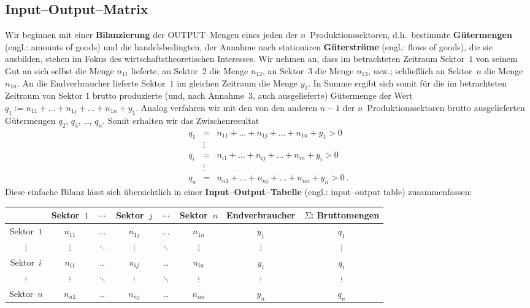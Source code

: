 \subsection{Input--Output--Matrix}
Wir beginnen mit einer {\bf Bilanzierung} der OUTPUT--Mengen eines
jeden der $n$~Produktionssektoren, d.h.\ bestimmte
{\bf G\"utermengen} (engl.: amounts of goods) und die 
handelsbedingten, der Annahme nach station\"{a}ren {\bf 
G\"uterstr\"ome} (engl.: flows of goods), die sie ausbilden,
stehen im Fokus des wirtschaftstheoretischen Interesses. Wir nehmen
an, dass im betrachteten Zeitraum Sektor~$1$ von seinem Gut an sich
selbst die Menge $n_{11}$ lieferte, an Sektor~$2$ die Menge
$n_{12}$, an Sektor~$3$ die Menge $n_{13}$, usw.; schlie\ss lich
an Sektor~$n$ die Menge $n_{1n}$. An die Endverbraucher lieferte
Sektor~$1$ im gleichen Zeitraum die Menge $y_{1}$. In Summe ergibt
sich somit f\"ur die im betrachteten Zeitraum von Sektor $1$ brutto
produzierte (und, nach Annahme~3, auch ausgelieferte) G\"utermenge
der Wert
$q_{1}:=n_{11} + \ldots + n_{1j} + \ldots + n_{1n} + y_{1}$.
Analog verfahren wir mit den von den anderen $n-1$ der
$n$~Produktionssektoren brutto ausgelieferten G\"utermengen
$q_{2}$, $q_{3}$, \ldots, $q_{n}$. Somit erhalten wir das
Zwischenresultat
%
\begin{eqnarray}
q_{1} & = & n_{11} + \ldots + n_{1j} + \ldots + n_{1n} + y_{1} > 0
\\
 & \vdots & \nonumber \\
q_{i} & = & n_{i1} + \ldots + n_{ij} + \ldots + n_{in} + y_{i} > 0
\\
 & \vdots & \nonumber \\
q_{n} & = & n_{n1} + \ldots + n_{nj} + \ldots + n_{nn} + y_{n} > 0
\ .
\end{eqnarray}
%
Diese einfache Bilanz l\"asst sich \"ubersichtlich
in einer {\bf Input--Output--Tabelle} (engl.: input--output table) 
zusammenfassen:
%
\begin{center}
    \begin{tabular}[h]{c|ccccc|c|c}
    \hline\hline
    [Werte in ME] & Sektor~$1$ & $\cdots$ & Sektor~$j$ & $\cdots$ & Sektor~$n$ & Endverbraucher & $\Sigma$: Bruttomengen  \\
    \hline
    Sektor~$1$ & $n_{11}$ & $\ldots$ & $n_{1j}$ & $\ldots$ & $n_{1n}$ & $y_{1}$ & $q_{1}$ \\
    $\vdots$ & $\vdots$ & $\ddots$ & $\vdots$ & $\ddots$ & $\vdots$ & $\vdots$ & $\vdots$ \\
    Sektor~$i$ & $n_{i1}$ & \ldots & $n_{ij}$ & \ldots & $n_{in}$ & $y_{i}$ & $q_{i}$ \\
    $\vdots$ & $\vdots$ & $\ddots$ & $\vdots$ & $\ddots$ & $\vdots$ & $\vdots$ & $\vdots$ \\
    Sektor~$n$ & $n_{n1}$ & \ldots & $n_{nj}$ & \ldots & $n_{nn}$ & $y_{n}$ & $q_{n}$ \\
    \hline\hline
    \end{tabular}
\end{center}
